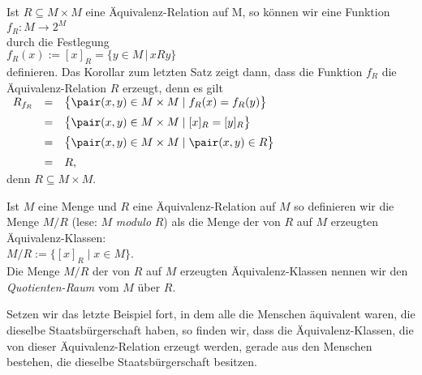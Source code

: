 \remark
Ist $R \subseteq M \times M$ eine \"{A}quivalenz-Relation auf M, so k\"{o}nnen wir eine Funktion
\\[0.2cm]
\hspace*{1.3cm}
$f_R : M \rightarrow 2^M$
\\[0.2cm]
durch die Festlegung
\\[0.2cm]
\hspace*{1.3cm}
$f_R(x) := [x]_R = \bigl\{ y \in M \,|\, x R y \bigr\}$
\\[0.2cm]
definieren.   Das Korollar zum letzten Satz zeigt dann, dass die Funktion $f_R$ die \"{A}quivalenz-Relation
$R$ erzeugt, denn es gilt
\\[0.2cm]
\hspace*{1.3cm}
$
\begin{array}[t]{lcl}
R_{f_R} & = & \bigl\{ \pair(x, y) \in M \times M \mid f_R(x) = f_R(y)  \bigr\}  \\[0.2cm]
        & = & \bigl\{ \pair(x, y) \in M \times M \mid [x]_R = [y]_R    \bigr\}  \\[0.2cm]
        & = & \bigl\{ \pair(x, y) \in M \times M \mid \pair(x,y) \in R \bigr\}  \\[0.2cm]
        & = & R,
\end{array}
$
\\[0.2cm]
denn  $R \subseteq M \times M$. \eox


\begin{Definition}
Ist $M$ eine Menge und $R$ eine \"{A}quivalenz-Relation auf $M$ so definieren wir die Menge $M/R$ (lese:
$M$ \emph{modulo} $R$) als die Menge der von $R$ auf $M$ erzeugten \"{A}quivalenz-Klassen:
\\[0.2cm]
\hspace*{1.3cm}
$M/R := \bigl\{ [x]_R \mid x \in M \bigr\}$.
\\[0.2cm]
Die Menge $M/R$ der von $R$ auf $M$ erzeugten \"{A}quivalenz-Klassen nennen wir den
\emph{Quotienten-Raum} vom $M$ \"{u}ber $R$.  \eox
\end{Definition}

\example
Setzen wir das letzte Beispiel fort, in dem alle die Menschen \"{a}quivalent waren, die dieselbe
Staatsb\"{u}rgerschaft haben, so finden wir, dass die \"{A}quivalenz-Klassen, die von dieser
\"{A}quivalenz-Relation erzeugt werden, gerade aus den Menschen bestehen, die dieselbe
Staatsb\"{u}rgerschaft besitzen.  \eox


